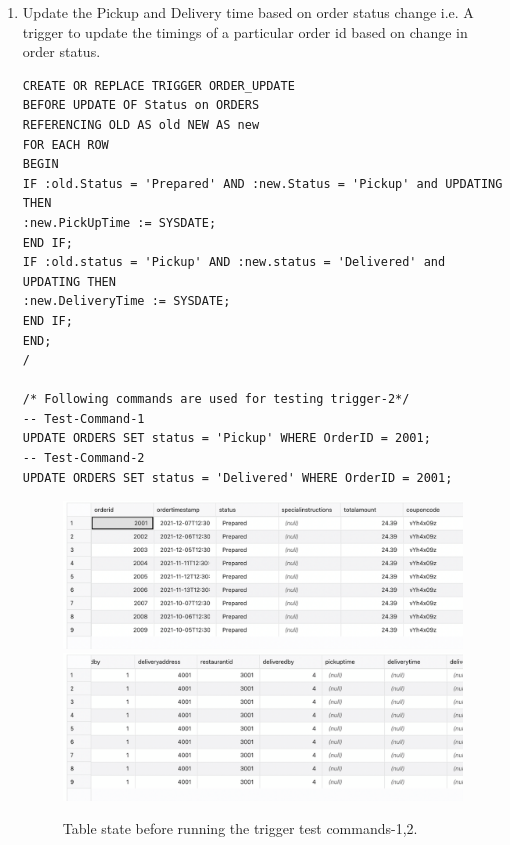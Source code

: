 \documentclass[12pt,letterpaper]{article}
\begin{document}
\begin{enumerate}
\item Update the Pickup and Delivery time based on order status change i.e. A trigger to update the timings of a particular order id based on change in order status.
\begin{lstlisting}
CREATE OR REPLACE TRIGGER ORDER_UPDATE
BEFORE UPDATE OF Status on ORDERS
REFERENCING OLD AS old NEW AS new
FOR EACH ROW
BEGIN  
IF :old.Status = 'Prepared' AND :new.Status = 'Pickup' and UPDATING THEN
:new.PickUpTime := SYSDATE;
END IF;
IF :old.status = 'Pickup' AND :new.status = 'Delivered' and UPDATING THEN
:new.DeliveryTime := SYSDATE;
END IF;
END;
/

/* Following commands are used for testing trigger-2*/
-- Test-Command-1
UPDATE ORDERS SET status = 'Pickup' WHERE OrderID = 2001;
-- Test-Command-2
UPDATE ORDERS SET status = 'Delivered' WHERE OrderID = 2001;

\end{lstlisting}
\begin{figure}[H]
    \includegraphics[width=\textwidth]{figures/Picture27.png}\hfill
    \includegraphics[width=\textwidth]{figures/Picture28.png}\hfill
    \\[\smallskipamount]
    \caption{Table state before running the trigger test commands-{1,2}.}\label{fig:trig21}
\end{figure}


\end{enumerate}
\end{document}
